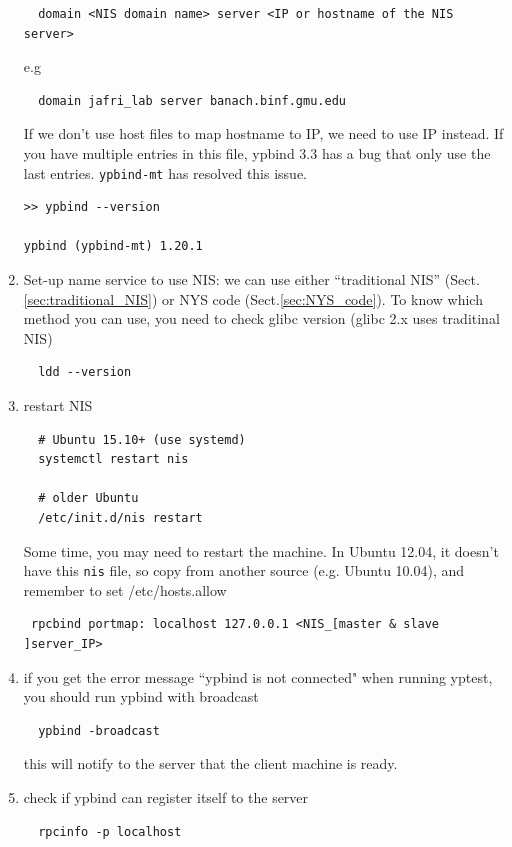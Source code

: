\begin{enumerate}
  \begin{verbatim}
  domain <NIS domain name> server <IP or hostname of the NIS server>
  \end{verbatim}

  e.g
  \begin{verbatim}
  domain jafri_lab server banach.binf.gmu.edu
  \end{verbatim}

  If we don't use host files to map hostname to IP, we need to use IP instead.
  If you have multiple entries in this file, ypbind 3.3 has a bug that only use
  the last entries. \verb!ypbind-mt! has resolved this issue. 
\begin{verbatim}
>> ypbind --version

ypbind (ypbind-mt) 1.20.1
\end{verbatim}  
  
% 
% 


  \item Set-up name service to use NIS: we can use either ``traditional NIS''
  (Sect.\ref{sec:traditional_NIS}) or NYS code (Sect.\ref{sec:NYS_code}). To
  know which method you can use, you need to check glibc version (glibc 2.x
  uses traditinal NIS)
  \begin{verbatim}
  ldd --version
  \end{verbatim}
  
  \item restart NIS
  \begin{verbatim}
  # Ubuntu 15.10+ (use systemd)
  systemctl restart nis
  
  # older Ubuntu
  /etc/init.d/nis restart
  \end{verbatim}
  Some time, you may need to restart the machine. In Ubuntu 12.04, it doesn't
  have this \verb!nis! file, so copy from another source (e.g. Ubuntu 10.04),
  and remember to set /etc/hosts.allow
 \begin{verbatim}
 rpcbind portmap: localhost 127.0.0.1 <NIS_[master & slave ]server_IP>
 \end{verbatim}
  
  
  \item if you get the error message ``ypbind is not connected" when running
  yptest, you should run ypbind with broadcast
  \begin{verbatim}
  ypbind -broadcast
  \end{verbatim}
  this will notify to the server that the client machine is ready.
  
  \item check if ypbind can register itself to the server
  \begin{verbatim}
  rpcinfo -p localhost
  \end{verbatim}
\end{enumerate}


